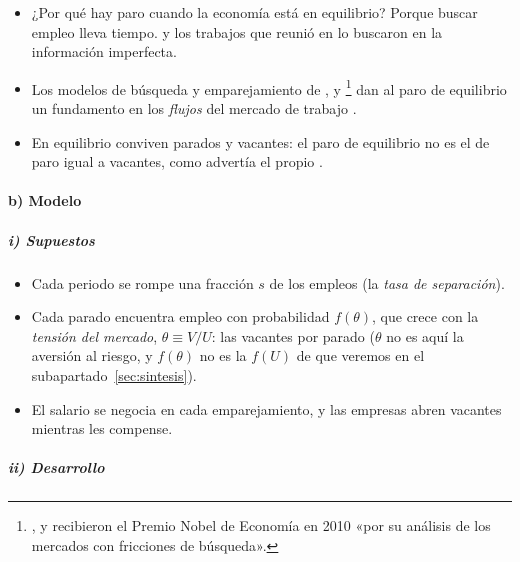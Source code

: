 \documentclass[11pt]{article}
\begin{document}
\begin{itemize}
\item ¿Por qué hay paro cuando la economía está en equilibrio? Porque buscar empleo lleva tiempo. \textcite{Phelps1968Money} y los trabajos que reunió en \textcite{Phelps1970Microeconomic} lo buscaron en la información imperfecta.
\item Los modelos de búsqueda y emparejamiento de ,  y \footnote{,  y  recibieron el Premio Nobel de Economía en 2010 «por su análisis de los mercados con fricciones de búsqueda»\nocite{Nobel2010DiamondMortensenPissarides}.} dan al paro de equilibrio un fundamento en los \emph{flujos} del mercado de trabajo\nocite{Pissarides2000Equilibrium} .
\item En equilibrio conviven parados y vacantes: el paro de equilibrio no es el de paro igual a vacantes, como advertía el propio \nocite{Friedman1968Role}.
\end{itemize}

\paragraph{b) Modelo}

\subparagraph{i) Supuestos}

\begin{itemize}
\item Cada periodo se rompe una fracción $s$ de los empleos (la \emph{tasa de separación}).
\item Cada parado encuentra empleo con probabilidad $f(\theta)$, que crece con la \emph{tensión del mercado}, $\theta\equiv V/U$: las vacantes por parado ($\theta$ no es aquí la aversión al riesgo, y $f(\theta)$ no es la $f(U)$ de  que veremos en el subapartado~\ref{sec:sintesis}).
\item El salario se negocia en cada emparejamiento, y las empresas abren vacantes mientras les compense.
\end{itemize}

\subparagraph{ii) Desarrollo}
\end{document}
